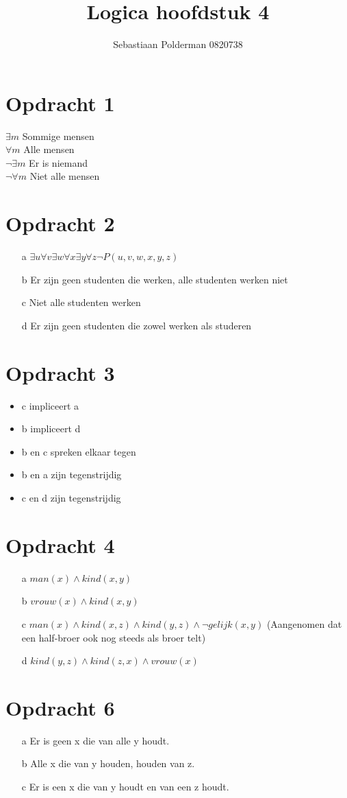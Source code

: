 \documentclass{artikel1}
\author{Sebastiaan Polderman 0820738}
\title{Logica hoofdstuk 4}
\begin{document}
\maketitle

\section{Opdracht 1}
$\exists m$ Sommige mensen\\
$\forall m$ Alle mensen\\
$\neg\exists m$ Er is niemand\\
$\neg\forall m$ Niet alle mensen\\
\section{Opdracht 2}
\begin{itemize}
\item[a] $\exists u \forall v \exists w \forall x \exists y \forall z \neg P (u,v,w,x,y,z)$
\item[b] Er zijn geen studenten die werken, alle studenten werken niet
\item[c] Niet alle studenten werken
\item[d] Er zijn geen studenten die zowel werken als studeren
\end{itemize}
\section{Opdracht 3}
\begin{itemize}
\item c impliceert a
\item b impliceert d
\item b en c spreken elkaar tegen
\item b en a zijn tegenstrijdig
\item c en d zijn tegenstrijdig
\end{itemize}
\section{Opdracht 4}
\begin{itemize}
\item[a]$man(x) \wedge kind(x,y)$
\item[b]$vrouw(x) \wedge kind(x,y)$
\item[c]$man(x) \wedge kind(x,z) \wedge kind(y,z) \wedge \neg gelijk(x,y)$ (Aangenomen dat een half-broer ook nog steeds als broer telt)
\item[d]$kind(y,z) \wedge kind(z,x) \wedge vrouw(x)$
\end{itemize}
\section{Opdracht 6}
\begin{itemize}
\item[a] Er is geen x die van alle y houdt.
\item[b] Alle x die van y houden, houden van z.
\item[c] Er is een x die van y houdt en van een z houdt.
\end{itemize}
\end{document}
